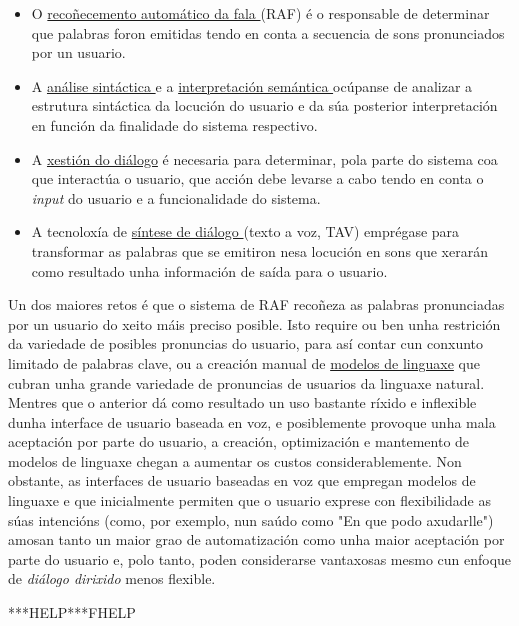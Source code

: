 \begin{multicols}{2}
    \begin{itemize}
      \item O \uline{recoñecemento automático da fala } (RAF) é o responsable de determinar que palabras foron emitidas tendo en conta a secuencia de sons pronunciados por un usuario.
      \item A \uline{análise sintáctica } e a \uline{interpretación semántica } ocúpanse de analizar a estrutura sintáctica da locución do usuario e da súa posterior interpretación en función da finalidade do sistema respectivo.
      \item A \uline{xestión do diálogo} é necesaria para determinar, pola parte do sistema coa que interactúa o usuario, que acción debe levarse a cabo tendo en conta o \textit{input} do usuario e a funcionalidade do sistema.
      \item A tecnoloxía de  \uline{síntese de diálogo }(texto a voz, TAV) emprégase para transformar as palabras que se emitiron nesa locución en sons que xerarán como resultado unha información de saída para o usuario.  

    \end{itemize}
 
  Un dos maiores retos é que o sistema de RAF recoñeza as palabras pronunciadas por un usuario do xeito máis preciso posible. Isto require ou ben unha restrición da variedade de posibles pronuncias do usuario, para así contar cun conxunto limitado de palabras clave, ou a creación manual de \uline{modelos de linguaxe} que cubran unha grande variedade de pronuncias de usuarios da linguaxe natural. Mentres que o anterior dá como resultado un uso bastante ríxido e inflexible dunha interface de usuario baseada en voz, e posiblemente provoque unha mala aceptación por parte do usuario, a creación, optimización e mantemento de modelos de linguaxe chegan a aumentar os custos considerablemente. Non obstante, as interfaces de usuario baseadas en voz que empregan modelos de linguaxe e que inicialmente permiten que o usuario exprese con flexibilidade as súas intencións (como, por exemplo, nun saúdo como "En que podo axudarlle") amosan tanto un maior grao de automatización como unha maior aceptación por parte do usuario e, polo tanto, poden considerarse vantaxosas mesmo cun enfoque de \textit{diálogo dirixido }  menos flexible.

***HELP***FHELP


\end{multicols}
